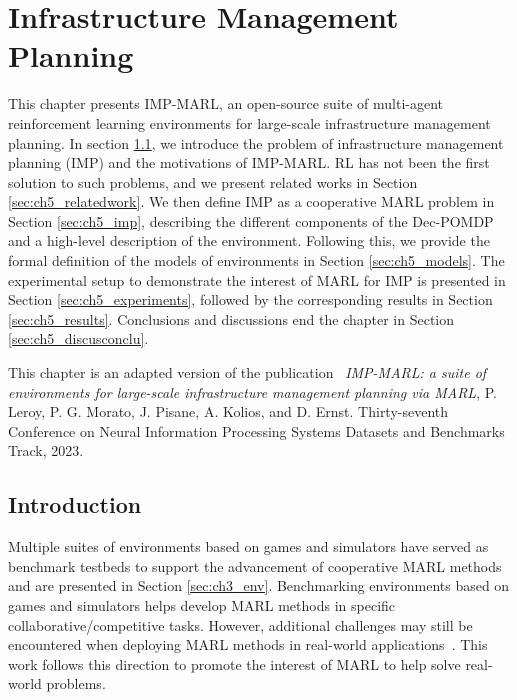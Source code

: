 \chapter{Infrastructure Management Planning}\label{ch:impmarl}

\begin{chapter_outline}

This chapter presents IMP-MARL, an open-source suite of multi-agent reinforcement learning environments for large-scale infrastructure management planning.
In section \ref{sec:ch5_intro}, we introduce the problem of infrastructure management planning (IMP) and the motivations of IMP-MARL.
RL has not been the first solution to such problems, and we present related works in Section \ref{sec:ch5_relatedwork}.
We then define IMP as a cooperative MARL problem in Section \ref{sec:ch5_imp}, describing the different components of the Dec-POMDP and a high-level description of the environment.
Following this, we provide the formal definition of the models of environments in Section \ref{sec:ch5_models}.
The experimental setup to demonstrate the interest of MARL for IMP is presented in Section \ref{sec:ch5_experiments}, followed by the corresponding results in Section \ref{sec:ch5_results}.
Conclusions and discussions end the chapter in Section \ref{sec:ch5_discusconclu}.

This chapter is an adapted version of the publication~\citep{leroy2023impmarl} \textit{IMP-MARL: a suite of environments for large-scale infrastructure management planning via MARL}, P. Leroy, P. G. Morato, J. Pisane, A. Kolios, and D. Ernst. Thirty-seventh Conference on Neural Information Processing Systems Datasets and Benchmarks Track, 2023.
\end{chapter_outline}

\section{Introduction}\label{sec:ch5_intro}
Multiple suites of environments based on games and simulators have served as benchmark testbeds to support the advancement of cooperative MARL methods and are presented in Section \ref{sec:ch3_env}.
Benchmarking environments based on games and simulators helps develop MARL methods in specific collaborative/competitive tasks.
However, additional challenges may still be encountered when deploying MARL methods in real-world applications~\citep{oroojlooy2022review}.
This work follows this direction to promote the interest of MARL to help solve real-world problems.

